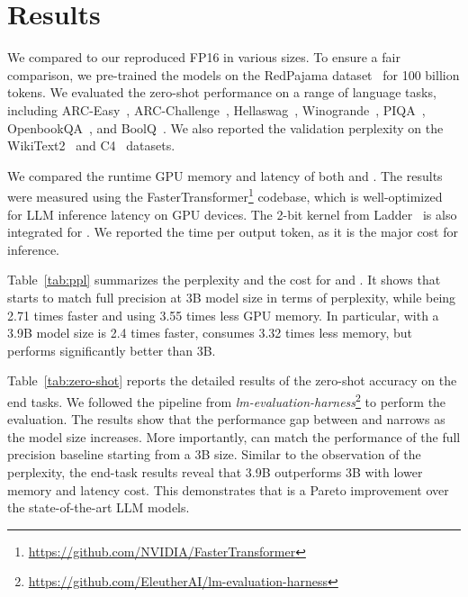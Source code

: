 \section{Results}

We compared  to our reproduced FP16  in various sizes. To ensure a fair comparison, we pre-trained the models on the RedPajama dataset~\cite{redpajama} for 100 billion tokens. We evaluated the zero-shot performance on a range of language tasks, including ARC-Easy~\cite{arc}, ARC-Challenge~\cite{arc}, Hellaswag~\cite{hellaswag}, Winogrande~\cite{winoGrande}, PIQA~\cite{piqa}, OpenbookQA~\cite{openbookqa}, and BoolQ~\cite{boolq}. We also reported the validation perplexity on the WikiText2~\cite{wikitext2} and C4~\cite{c4} datasets.

We compared the runtime GPU memory and latency of both  and . The results were measured using the FasterTransformer\footnote{\url{https://github.com/NVIDIA/FasterTransformer}} codebase, which is well-optimized for LLM inference latency on GPU devices. The 2-bit kernel from Ladder~\cite{ladder} is also integrated for . We reported the time per output token, as it is the major cost for inference.

Table~\ref{tab:ppl} summarizes the perplexity and the cost for  and . It shows that  starts to match full precision  at 3B model size in terms of perplexity, while being 2.71 times faster and using 3.55 times less GPU memory. In particular,  with a 3.9B model size is 2.4 times faster, consumes 3.32 times less memory, but performs significantly better than  3B. 

Table~\ref{tab:zero-shot} reports the detailed results of the zero-shot accuracy on the end tasks. We followed the pipeline from \emph{lm-evaluation-harness}\footnote{\url{https://github.com/EleutherAI/lm-evaluation-harness}} to perform the evaluation. The results show that the performance gap between  and  narrows as the model size increases. More importantly,  can match the performance of the full precision baseline starting from a 3B size. Similar to the observation of the perplexity, the end-task results reveal that  3.9B outperforms  3B with lower memory and latency cost. This demonstrates that  is a Pareto improvement over the state-of-the-art LLM models.

